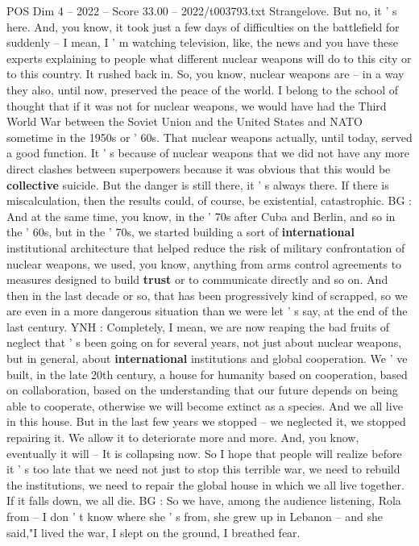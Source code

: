\begin{textsample}{POS Dim 4 – 2022 – Score 33.00 – 2022/t003793.txt}
Strangelove.
But no, it ' s here.
And, you know, it took just a few days of difficulties on the battlefield for suddenly -- I mean, I ' m watching television, like, the news and you have these experts explaining to people what different nuclear weapons will do to this city or to this country.
It rushed back in.
So, you know, nuclear weapons are -- in a way they also, until now, preserved the peace of the world.
I belong to the school of thought that if it was not for nuclear weapons, we would have had the Third World War between the Soviet Union and the United States and NATO sometime in the 1950s or ' 60s.
That nuclear weapons actually, until today, served a good function.
It ' s because of nuclear weapons that we did not have any more direct clashes between superpowers because it was obvious that this would be \textbf{collective} suicide.
But the danger is still there, it ' s always there.
If there is miscalculation, then the results could, of course, be existential, catastrophic.
BG : And at the same time, you know, in the ' 70s after Cuba and Berlin, and so in the ' 60s, but in the ' 70s, we started building a sort of \textbf{international} institutional architecture that helped reduce the risk of military confrontation of nuclear weapons, we used, you know, anything from arms control agreements to measures designed to build \textbf{trust} or to communicate directly and so on.
And then in the last decade or so, that has been progressively kind of scrapped, so we are even in a more dangerous situation than we were let ' s say, at the end of the last century.
YNH : Completely, I mean, we are now reaping the bad fruits of neglect that ' s been going on for several years, not just about nuclear weapons, but in general, about \textbf{international} institutions and global cooperation.
We ' ve built, in the late 20th century, a house for humanity based on cooperation, based on collaboration, based on the understanding that our future depends on being able to cooperate, otherwise we will become extinct as a species.
And we all live in this house.
But in the last few years we stopped -- we neglected it, we stopped repairing it.
We allow it to deteriorate more and more.
And, you know, eventually it will -- It is collapsing now.
So I hope that people will realize before it ' s too late that we need not just to stop this terrible war, we need to rebuild the institutions, we need to repair the global house in which we all live together.
If it falls down, we all die.
BG : So we have, among the audience listening, Rola from -- I don ' t know where she ' s from, she grew up in Lebanon -- and she said,"I lived the war, I slept on the ground, I breathed fear.

\end{textsample}
